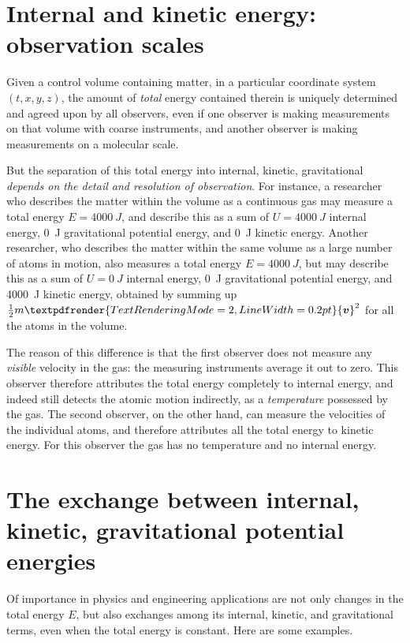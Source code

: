 \documentclass[a4paper,12pt,%
onecolumn,oneside,%
british%
]{memoir}
\renewcommand*{\bm}[1]{\textpdfrender{TextRenderingMode=2,LineWidth=0.2pt}{\boldsymbol{#1}}}
\renewcommand*{\|}[1][]{\nonscript\:#1\vert\nonscript\:\mathopen{}}
\newcommand*{\yv}{\bm{v}}
\newcommand*{\ym}{m}%
\newcommand*{\yE}{E}
\newcommand*{\yU}{U}
\begin{document}
\section{Internal and kinetic energy: observation scales}
\label{sec:dependence_energycontentdivision}

Given a control volume containing matter, in a particular coordinate system $(t,x,y,z)$, the amount of \emph{total} energy contained therein is uniquely determined and agreed upon by all observers, even if one observer is making measurements on that volume with coarse instruments, and another observer is making measurements on a molecular scale.

But the separation of this total energy into internal, kinetic, gravitational \emph{depends on the detail and resolution of observation}. For instance, a researcher who describes the matter within the volume as a continuous gas may measure a total energy $\yE=\qty{4000}{J}$, and describe this as a sum of $\yU=\qty{4000}{J}$ internal energy, \qty{0}{J} gravitational potential energy, and \qty{0}{J} kinetic energy. Another researcher, who describes the matter within the same volume as a large number of atoms in motion, also measures a total energy $\yE=\qty{4000}{J}$, but may describe this as a sum of $\yU=\qty{0}{J}$ internal energy, \qty{0}{J} gravitational potential energy, and \qty{4000}{J} kinetic energy, obtained by summing up $\tfrac12\ym\yv^{2}$ for all the atoms in the volume.

The reason of this difference is that the first observer does not measure any \emph{visible} velocity in the gas: the measuring instruments average it out to zero. This observer therefore attributes the total energy completely to internal energy, and indeed still detects the atomic motion indirectly, as a \emph{temperature} possessed by the gas. The second observer, on the other hand, can measure the velocities of the individual atoms, and therefore attributes all the total energy to kinetic energy. For this observer the gas has no temperature and no internal energy.


\section{The exchange between internal, kinetic, gravitational potential energies}
\label{sec:energy_constitutive_content}

Of importance in physics and engineering applications are not only changes in the total energy $\yE$, but also exchanges among its internal, kinetic, and gravitational terms, even when the total energy is constant. Here are some examples.
\end{document}
